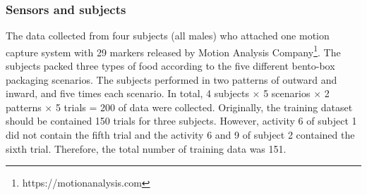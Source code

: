 \documentclass[graybox]{svmult}
\begin{document}
\subsubsection{Sensors and subjects}
The data collected from four subjects (all males) who attached one motion capture system with 29 markers released by Motion Analysis Company\footnote{https://motionanalysis.com}. The subjects packed three types of food according to the five different bento-box packaging scenarios. The subjects performed in two patterns of outward and inward, and five times each scenario. In total, 4 subjects $\times$ 5 scenarios $\times$ 2 patterns $\times$ 5 trials = 200 of data were collected.
Originally, the training dataset should be contained 150 trials for three subjects. However, activity 6 of subject 1 did not contain the fifth trial and the activity 6 and 9 of subject 2 contained the sixth trial. Therefore, the total number of training data was 151.
\end{document}
